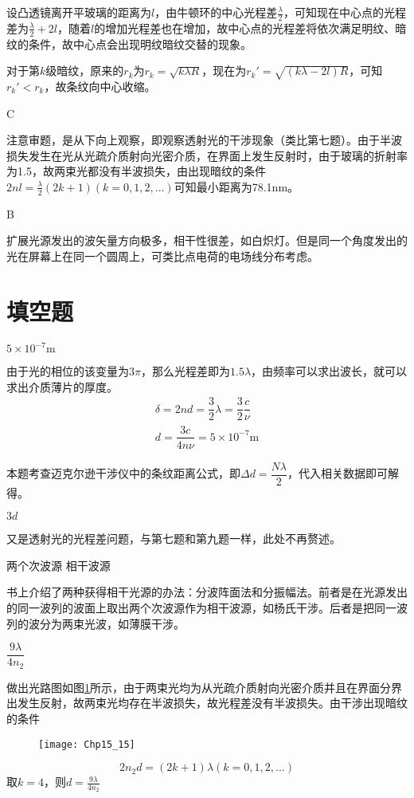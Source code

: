 设凸透镜离开平玻璃的距离为$l$，由牛顿环的中心光程差$\frac{\lambda}{2}$，可知现在中心点的光程差为$\frac{\lambda}{2}+2l$，随着$l$的增加光程差也在增加，故中心点的光程差将依次满足明纹、暗纹的条件，故中心点会出现明纹暗纹交替的现象。

对于第$k$级暗纹，原来的$r_k$为$r_k=\sqrt{k\lambda R}$，现在为$r_k'=\sqrt{(k\lambda-2l)R}$，可知$r_k'<r_k$，故条纹向中心收缩。

\exercise C

\solve 注意审题，是从下向上观察，即观察透射光的干涉现象（类比第七题）。由于半波损失发生在光从光疏介质射向光密介质，在界面上发生反射时，由于玻璃的折射率为1.5，故两束光都没有半波损失，由出现暗纹的条件$2nl=\frac{\lambda}{2}(2k+1)(k=0,1,2,...)$可知最小距离为78.1nm。

\exercise B

\solve 扩展光源发出的波矢量方向极多，相干性很差，如白炽灯。但是同一个角度发出的光在屏幕上在同一个圆周上，可类比点电荷的电场线分布考虑。
\section{填空题}
\exercise $5\times10^{-7}\mathrm{m}$ 

\solve 由于光的相位的该变量为$3\pi$，那么光程差即为$1.5\lambda$，由频率可以求出波长，就可以求出介质薄片的厚度。
\begin{gather*}
	\delta=2nd=\dfrac{3}{2}\lambda=\dfrac{3}{2}\dfrac{c}{\nu}\\
	d=\dfrac{3c}{4n\nu}=5\times 10^{-7}\mathrm{m}
\end{gather*}


\solve 本题考查迈克尔逊干涉仪中的条纹距离公式，即$\Delta d=\dfrac{Nλ}{2}$，代入相关数据即可解得。

\exercise $3d$

\solve  又是透射光的光程差问题，与第七题和第九题一样，此处不再赘述。

\exercise 两个次波源 \quad 相干波源 

\solve 书上介绍了两种获得相干光源的办法：分波阵面法和分振幅法。前者是在光源发出的同一波列的波面上取出两个次波源作为相干波源，如杨氏干涉。后者是把同一波列的波分为两束光波，如薄膜干涉。

\exercise $\dfrac{9\lambda}{4n_2}$

\solve 做出光路图如图\ref{fig:15_15}所示，由于两束光均为从光疏介质射向光密介质并且在界面分界出发生反射，故两束光均存在半波损失，故光程差没有半波损失。由干涉出现暗纹的条件
\begin{figure}[!h]
	\centering
	\texttt{[image: Chp15\_15]}
	\caption{}\label{fig:15_15}
\end{figure}
\[
2n_2d=(2k+1)\lambda(k=0,1,2,...)
\]
取$k=4$，则$d=\frac{9\lambda}{4n_2}$

